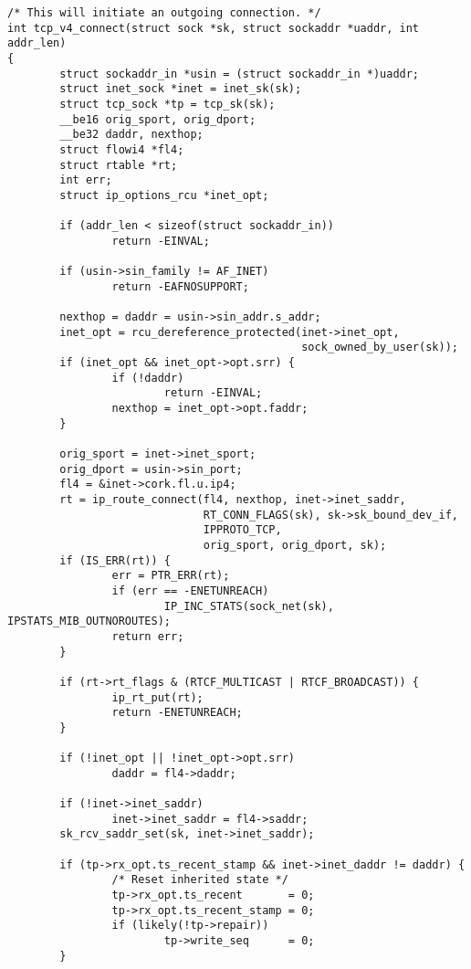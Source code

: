 \begin{verbatim}
/* This will initiate an outgoing connection. */
int tcp_v4_connect(struct sock *sk, struct sockaddr *uaddr, int addr_len)
{
        struct sockaddr_in *usin = (struct sockaddr_in *)uaddr;
        struct inet_sock *inet = inet_sk(sk);
        struct tcp_sock *tp = tcp_sk(sk);
        __be16 orig_sport, orig_dport;
        __be32 daddr, nexthop;
        struct flowi4 *fl4;
        struct rtable *rt;
        int err;
        struct ip_options_rcu *inet_opt;

        if (addr_len < sizeof(struct sockaddr_in))
                return -EINVAL;

        if (usin->sin_family != AF_INET)
                return -EAFNOSUPPORT;

        nexthop = daddr = usin->sin_addr.s_addr;
        inet_opt = rcu_dereference_protected(inet->inet_opt,
                                             sock_owned_by_user(sk));
        if (inet_opt && inet_opt->opt.srr) {
                if (!daddr)
                        return -EINVAL;
                nexthop = inet_opt->opt.faddr;
        }

        orig_sport = inet->inet_sport;
        orig_dport = usin->sin_port;
        fl4 = &inet->cork.fl.u.ip4;
        rt = ip_route_connect(fl4, nexthop, inet->inet_saddr,
                              RT_CONN_FLAGS(sk), sk->sk_bound_dev_if,
                              IPPROTO_TCP,
                              orig_sport, orig_dport, sk);
        if (IS_ERR(rt)) {
                err = PTR_ERR(rt);
                if (err == -ENETUNREACH)
                        IP_INC_STATS(sock_net(sk), IPSTATS_MIB_OUTNOROUTES);
                return err;
        }

        if (rt->rt_flags & (RTCF_MULTICAST | RTCF_BROADCAST)) {
                ip_rt_put(rt);
                return -ENETUNREACH;
        }

        if (!inet_opt || !inet_opt->opt.srr)
                daddr = fl4->daddr;

        if (!inet->inet_saddr)
                inet->inet_saddr = fl4->saddr;
        sk_rcv_saddr_set(sk, inet->inet_saddr);

        if (tp->rx_opt.ts_recent_stamp && inet->inet_daddr != daddr) {
                /* Reset inherited state */
                tp->rx_opt.ts_recent       = 0;
                tp->rx_opt.ts_recent_stamp = 0;
                if (likely(!tp->repair))
                        tp->write_seq      = 0;
        }


\end{verbatim}
